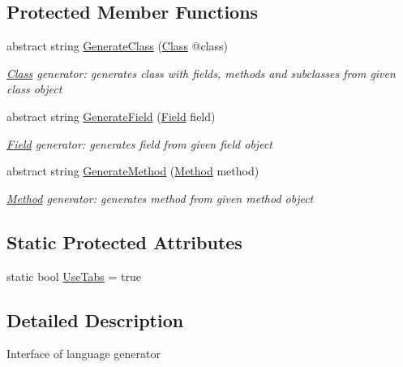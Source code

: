 \subsection*{Protected Member Functions}
\begin{DoxyCompactItemize}
\item 
abstract string \mbox{\hyperlink{classCodeGen_1_1generators_1_1Generator_a8847fd8b6d408a0dfc087dcc1dc58340}{Generate\+Class}} (\mbox{\hyperlink{classCodeGen_1_1generators_1_1Class}{Class}} @class)
\begin{DoxyCompactList}\small\item\em \mbox{\hyperlink{classCodeGen_1_1generators_1_1Class}{Class}} generator\+: generates class with fields, methods and subclasses from given class object \end{DoxyCompactList}\item 
abstract string \mbox{\hyperlink{classCodeGen_1_1generators_1_1Generator_a0d1a48aedbca08c05af734a43739d1c3}{Generate\+Field}} (\mbox{\hyperlink{classCodeGen_1_1generators_1_1Field}{Field}} field)
\begin{DoxyCompactList}\small\item\em \mbox{\hyperlink{classCodeGen_1_1generators_1_1Field}{Field}} generator\+: generates field from given field object \end{DoxyCompactList}\item 
abstract string \mbox{\hyperlink{classCodeGen_1_1generators_1_1Generator_a04fc9bd217b3b8c3d5f7b1a3f92c79d3}{Generate\+Method}} (\mbox{\hyperlink{classCodeGen_1_1generators_1_1Method}{Method}} method)
\begin{DoxyCompactList}\small\item\em \mbox{\hyperlink{classCodeGen_1_1generators_1_1Method}{Method}} generator\+: generates method from given method object \end{DoxyCompactList}\end{DoxyCompactItemize}
\subsection*{Static Protected Attributes}
\begin{DoxyCompactItemize}
\item 
static bool \mbox{\hyperlink{classCodeGen_1_1generators_1_1Generator_a7a3edb5addb8b879b39666718f32514d}{Use\+Tabs}} = true
\end{DoxyCompactItemize}


\subsection{Detailed Description}
Interface of language generator 



